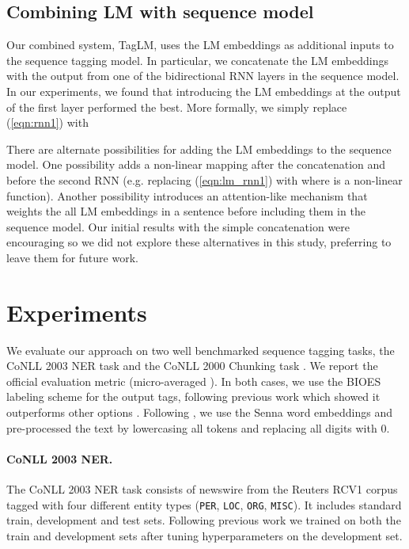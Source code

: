 \documentclass[11pt,a4paper]{article}
\begin{document}
\subsection{Combining LM with sequence model}
\label{sec:combining}

Our combined system, TagLM, uses the LM embeddings as additional inputs to the sequence tagging model.
In particular, we concatenate the LM embeddings  with the output from one of the bidirectional RNN
layers in the sequence model.
In our experiments, we found that introducing the LM embeddings
at the output of the first layer performed the best.  More formally, we simply replace (\ref{eqn:rnn1}) with


There are alternate possibilities for adding the LM embeddings to the sequence model.  One possibility adds a non-linear mapping after the concatenation and before the second RNN (e.g. replacing (\ref{eqn:lm_rnn1}) with  where  is a non-linear function). Another possibility introduces an attention-like mechanism that weights the all LM embeddings in a sentence before including them in the sequence model.  
Our initial results with the simple concatenation were encouraging so we did not explore these alternatives in this study, preferring to leave them for future work.






\section{Experiments}

We evaluate our approach on two well benchmarked sequence tagging tasks,
the CoNLL 2003 NER task \citep{CoNLL2003NER} and the CoNLL 2000 Chunking task
\citep{CoNLL2000Chunking}.
We report the official evaluation metric
(micro-averaged ).  In both cases, we use
the BIOES labeling scheme for the output tags,
following previous work which showed it outperforms other options
\citep[e.g.,][]{Ratinov2009DesignCA}.
Following \citet{chiu-nichols-2016}, we use the Senna word embeddings \citep{NLPfromScratch:Collobert2011} and pre-processed the text by
lowercasing all tokens and replacing all digits with 0. 

\paragraph{CoNLL 2003 NER.}
The CoNLL 2003 NER task consists of newswire from the Reuters RCV1 corpus tagged with four
different entity types (\texttt{PER}, \texttt{LOC}, \texttt{ORG}, \texttt{MISC}).  It includes
standard train, development and test sets.  Following previous work \citep{yang-transfer-iclr07,chiu-nichols-2016} we trained on both the train and development sets after tuning hyperparameters on the development set. 
\end{document}
